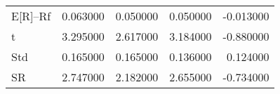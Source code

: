 \begin{tabular}{lrrrr}
\toprule
\midrule
E[R]--Rf & 0.063000 & 0.050000 & 0.050000 & -0.013000 \\
t & 3.295000 & 2.617000 & 3.184000 & -0.880000 \\
Std & 0.165000 & 0.165000 & 0.136000 & 0.124000 \\
SR & 2.747000 & 2.182000 & 2.655000 & -0.734000 \\
\bottomrule
\end{tabular}
